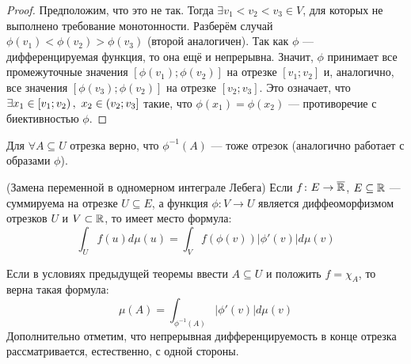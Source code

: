 \begin{proof}
	Предположим, что это не так. Тогда $\exists v_1 < v_2 < v_3 \in V$, для которых не выполнено требование монотонности. Разберём случай $\phi(v_1) < \phi(v_2) > \phi(v_3)$ (второй аналогичен). Так как $\phi$ --- дифференцируемая функция, то она ещё и непрерывна. Значит, $\phi$ принимает все промежуточные значения $[\phi(v_1); \phi(v_2)]$ на отрезке $[v_1; v_2]$ и, аналогично, все значения $[\phi(v_3); \phi(v_2)]$ на отрезке $[v_2; v_3]$. Это означает, что $\exists x_1 \in \left[v_1; v_2\right),\ x_2 \in \left(v_2; v_3\right]$ такие, что $\phi(x_1) = \phi(x_2)$ --- противоречие с биективностью $\phi$.
\end{proof}

\begin{corollary}
	Для $\forall A \subseteq U$ отрезка верно, что $\phi^{-1}(A)$ --- тоже отрезок (аналогично работает с образами $\phi$).
\end{corollary}

\begin{theorem} (Замена переменной в одномерном интеграле Лебега)
	Если $f \colon E \to \overline{\mathbb{R}}$, $E \subseteq \mathbb{R}$ --- суммируема на отрезке $U \subseteq E$, а функция $\phi \colon V \to U$ является диффеоморфизмом отрезков $U$ и $V \subset \mathbb{R}$, то имеет место формула:
	\[
		\int_U f(u)d\mu(u) = \int_V f(\phi(v))|\phi'(v)|d\mu(v)
	\]
\end{theorem}

\begin{note}
	Если в условиях предыдущей теоремы ввести $A \subseteq U$ и положить $f = \chi_A$, то верна такая формула:
	\[
		\mu(A) = \int_{\phi^{-1}(A)} |\phi'(v)|d\mu(v)
	\]
	Дополнительно отметим, что непрерывная дифференцируемость в конце отрезка рассматривается, естественно, с одной стороны.
\end{note}

